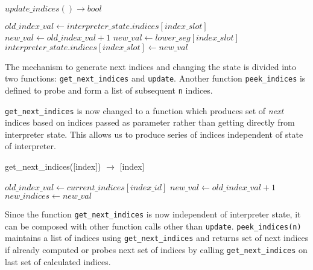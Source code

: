 \begin{algorithm}  {$update\_indices() \rightarrow bool$}
\singlespacing

\begin{algorithmic}[1]
\State $old\_index\_val \gets
interpreter\_state.indices[index\_slot]$
\State $new\_val \gets old\_index\_val + 1$
  \State $new\_val \gets lower\_seg[index\_slot]$
\EndIf
\State $interpreter\_state.indices[index\_slot] \gets new\_val$
\EndFor
{}
  \State {}
\Else
  \State {}
\EndIf
\EndProcedure
\end{algorithmic}
\end{algorithm}

The mechanism to generate next indices and changing the state is
divided into two functions: \texttt{get\_next\_indices} and \texttt{update}.
Another function \texttt{peek\_indices} is defined to probe and form a list
of subsequent \texttt{n} indices.

\texttt{get\_next\_indices} is now changed to a function which produces set of
\textit{next} indices based on indices passed as parameter rather than getting
directly from interpreter state. This allows us to produce series of indices
independent of state of interpreter.

\begin{algorithm}  {get\_next\_indices([index]) $\rightarrow$ [index]}
\singlespacing

\begin{algorithmic}[1]
\State $old\_index\_val \gets current\_indices[index\_id]$
\State $new\_val \gets old\_index\_val + 1$
\State $new\_indices \gets new\_val$
\EndFor%
\State {}
\EndFunction
\end{algorithmic}
\end{algorithm}

Since the function \texttt{get\_next\_indices} is now independent of interpreter
state, it can be composed with other function calls other than \texttt{update}.
\texttt{peek\_indices(n)} maintains a list of indices using \texttt{get\_next\_indices}
and returns set of next indices if already computed or probes next set of indices
by calling \texttt{get\_next\_indices} on last set of calculated indices.

